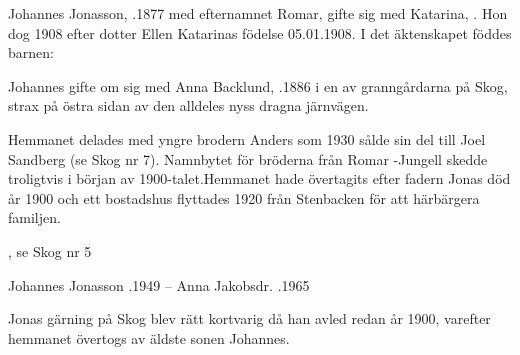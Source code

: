Johannes Jonasson, .1877 med efternamnet Romar, gifte sig med Katarina, . Hon dog 1908 efter dotter Ellen Katarinas födelse 05.01.1908. I det äktenskapet föddes barnen:

\begin{jhchildren}
  \item {}
  \item {}
  \item {}
\end{jhchildren}

Johannes gifte om sig med Anna Backlund, .1886 i en av granngårdarna på Skog, strax på östra sidan av den alldeles nyss dragna järnvägen.

Hemmanet delades med yngre brodern Anders som 1930 sålde sin del till Joel Sandberg (se Skog nr 7). Namnbytet för bröderna från Romar -Jungell skedde troligtvis i början av 1900-talet.Hemmanet hade övertagits efter fadern Jonas död år 1900 och ett bostadshus flyttades 1920 från Stenbacken för att härbärgera familjen.

\begin{jhchildren}
  \item {}, se Skog nr 5
  \item {}
  \item {}
  \item {}
\end{jhchildren}

Johannes Jonasson .1949   --   Anna Jakobsdr. .1965



Jonas gärning på Skog blev rätt kortvarig då han avled redan år 1900, varefter hemmanet övertogs av äldste sonen Johannes.

\begin{jhchildren}
  \item {}
  \item {}
  \item {}
  \item {}
  \item {}
  \item {}
  \item {}
\end{jhchildren}


